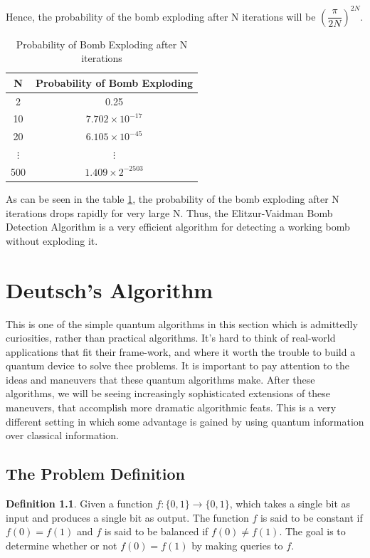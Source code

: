 \documentclass[12pt, oneside]{book}
\theoremstyle{definition}
\newtheorem{definition}{Definition}[section]
\theoremstyle{definition}
\theoremstyle{remark}
\begin{document}
\begin{enumerate}
    Hence, the probability of the bomb exploding after N iterations will be $\left(\dfrac{\pi}{2N}\right)^{2N}$.
    \begin{table}[H]
        \centering
        \begin{tabular}{|c|c|}
            \hline
            N & Probability of Bomb Exploding \\
            \hline
            2 & 0.25 \\
            10 & $7.702 \times 10^{-17}$  \\
            20 & $6.105 \times 10^{-45}$ \\
            $\vdots$ & $\vdots$ \\
            500 & $1.409 \times 2^{-2503}$ \\
            \hline
        \end{tabular}
        \caption{Probability of Bomb Exploding after N iterations}
        \label{tab:Prob}
    \end{table}
    As can be seen in the table \ref{tab:Prob}, the probability of the bomb exploding after N iterations drops rapidly for very large N. Thus, the Elitzur-Vaidman Bomb Detection Algorithm is a very efficient algorithm for detecting a working bomb without exploding it.
\end{enumerate}

\chapter{Deutsch's Algorithm}
This is one of the simple quantum algorithms in this section which is admittedly curiosities, rather than practical algorithms. It's hard to think of real-world applications that fit their frame-work, and where it worth the trouble to build a quantum device to solve thee problems. It is important to pay attention to the ideas and maneuvers that these quantum algorithms make. After these algorithms, we will be seeing increasingly sophisticated extensions of these maneuvers, that accomplish more dramatic algorithmic feats. This is a very different setting in which some advantage is gained by using quantum information over classical information.
\section{The Problem Definition}
\begin{definition}
    Given a function $f:\{0,1\}\rightarrow\{0,1\}$, which takes a single bit as input and 
    produces a single bit as output. The function $f$ is said to be constant if $f(0)=f(1)$ and $f$ is said to be balanced if $f(0)\neq f(1)$. The goal is to determine whether or not $f(0)=f(1)$ by making queries to $f$.
\end{definition}
\end{document}
